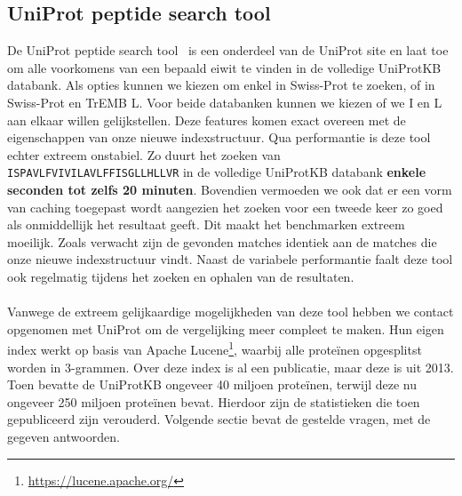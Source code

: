 \subsection{UniProt peptide search tool}
De UniProt peptide search tool~\cite{uniprot_search_paper, uniprot_search_site} is een onderdeel van de UniProt site en laat toe om alle voorkomens van een bepaald eiwit te vinden in de volledige UniProtKB databank.
Als opties kunnen we kiezen om enkel in Swiss-Prot te zoeken, of in Swiss-Prot en TrEMB L\@.
Voor beide databanken kunnen we kiezen of we I en L aan elkaar willen gelijkstellen.
Deze features komen exact overeen met de eigenschappen van onze nieuwe indexstructuur.
Qua performantie is deze tool echter extreem onstabiel.
Zo duurt het zoeken van \texttt{ISPAVLFVIVILAVLFFISGLLHLLVR} in de volledige UniProtKB databank \textbf{enkele seconden tot zelfs 20 minuten}.
Bovendien vermoeden we ook dat er een vorm van caching toegepast wordt aangezien het zoeken voor een tweede keer zo goed als onmiddellijk het resultaat geeft.
Dit maakt het benchmarken extreem moeilijk.
Zoals verwacht zijn de gevonden matches identiek aan de matches die onze nieuwe indexstructuur vindt.
Naast de variabele performantie faalt deze tool ook regelmatig tijdens het zoeken en ophalen van de resultaten.
\\ \\
Vanwege de extreem gelijkaardige mogelijkheden van deze tool hebben we contact opgenomen met UniProt om de vergelijking meer compleet te maken.
Hun eigen index werkt op basis van Apache Lucene\footnote{\url{https://lucene.apache.org/}}, waarbij alle proteïnen opgesplitst worden in 3-grammen.
Over deze index is al een publicatie, maar deze is uit 2013.
Toen bevatte de UniProtKB ongeveer 40 miljoen proteïnen, terwijl deze nu ongeveer 250 miljoen proteïnen bevat.
Hierdoor zijn de statistieken die toen gepubliceerd zijn verouderd.
Volgende sectie bevat de gestelde vragen, met de gegeven antwoorden.

